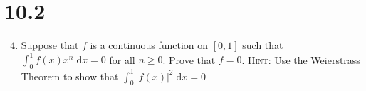 \documentclass[letterpaper]{article}
\begin{document}
\section*{10.2}
\begin{enumerate}
\setcounter{enumi}{3}
\item
Suppose that $f$ is a continuous function on $[0,1]$ such that $\int_0^1{f(x)x^n\;\mathrm{d}x}=0$ for all $n\ge 0$. Prove that $f=0$. {\scshape Hint:} Use the Weierstrass Theorem to show that $\int_0^1{|f(x)|^2\;\mathrm{d}x}=0$
\end{enumerate}
\end{document}
